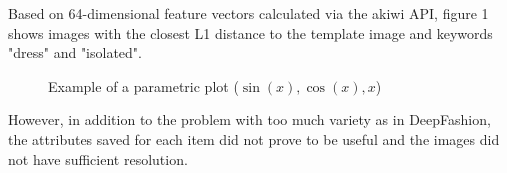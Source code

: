 \documentclass{article}
\begin{document}
Based on 64-dimensional feature vectors calculated via the akiwi API, figure 1 shows images with the closest L1 distance to the template image and keywords "dress" and "isolated". 

\begin{figure}[h]
\begin{multicols}{3}
\centering
{}\hfill
{}\hfill
{}
\end{multicols}
\caption{Example of a parametric plot ($\sin (x), \cos(x), x$)}
\end{figure}


However, in addition to the problem with too much variety as in DeepFashion, the attributes saved for each item did not prove to be useful and the images did not have sufficient resolution. 






\end{document}
